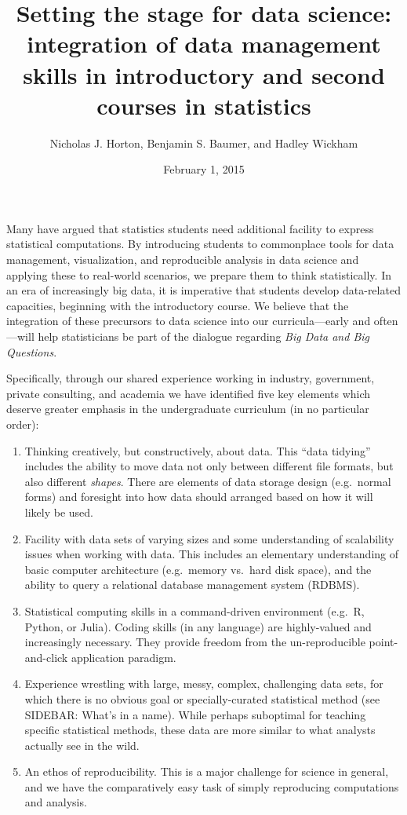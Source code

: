 \documentclass[]{article}
\title{Setting the stage for data science: integration of data management
skills in introductory and second courses in statistics}
\author{Nicholas J. Horton, Benjamin S. Baumer, and Hadley Wickham}
\date{February 1, 2015}
\begin{document}
\maketitle


Many have argued that statistics students need additional facility to
express statistical computations. By introducing students to commonplace
tools for data management, visualization, and reproducible analysis in
data science and applying these to real-world scenarios, we prepare them
to think statistically. In an era of increasingly big data, it is
imperative that students develop data-related capacities, beginning with
the introductory course. We believe that the integration of these
precursors to data science into our curricula---early and often---will
help statisticians be part of the dialogue regarding \emph{Big Data and
Big Questions}.

Specifically, through our shared experience working in industry,
government, private consulting, and academia we have identified five key
elements which deserve greater emphasis in the undergraduate curriculum
(in no particular order):

\begin{enumerate}
\itemsep1pt\parskip0pt
\item
  Thinking creatively, but constructively, about data. This ``data
  tidying'' includes the ability to move data not only between different
  file formats, but also different \emph{shapes}. There are elements of
  data storage design (e.g.~normal forms) and foresight into how data
  should arranged based on how it will likely be used.
\item
  Facility with data sets of varying sizes and some understanding of
  scalability issues when working with data. This includes an elementary
  understanding of basic computer architecture (e.g.~memory vs.~hard
  disk space), and the ability to query a relational database management
  system (RDBMS).
\item
  Statistical computing skills in a command-driven environment (e.g.~R,
  Python, or Julia). Coding skills (in any language) are highly-valued
  and increasingly necessary. They provide freedom from the
  un-reproducible point-and-click application paradigm.
\item
  Experience wrestling with large, messy, complex, challenging data
  sets, for which there is no obvious goal or specially-curated
  statistical method (see SIDEBAR: What's in a name). While perhaps
  suboptimal for teaching specific statistical methods, these data are
  more similar to what analysts actually see in the wild.
\item
  An ethos of reproducibility. This is a major challenge for science in
  general, and we have the comparatively easy task of simply reproducing
  computations and analysis.
\end{enumerate}
\end{document}
